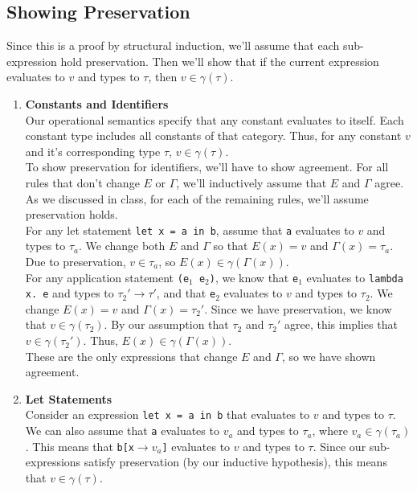 \documentclass[12pt]{article}
\newcommand{\G}{\Gamma}
\begin{document}
\subsection{Showing Preservation}
Since this is a proof by structural induction, we'll assume that each sub-expression hold preservation. Then we'll show that if the current expression evaluates to $v$ and types to $\tau$, then $v\in\gamma(\tau)$.

\begin{enumerate}
\item \textbf{Constants and Identifiers}\\
Our operational semantics specify that any constant evaluates to itself. Each constant type includes all constants of that category. Thus, for any constant $v$ and it's corresponding type $\tau$, $v\in\gamma(\tau)$.\\
To show preservation for identifiers, we'll have to show agreement. For all rules that don't change $E$ or $\G$, we'll inductively assume that $E$ and $\G$ agree. As we discussed in class, for each of the remaining rules, we'll assume preservation holds.\\
For any let statement \texttt{let x = a in b}, assume that \texttt{a} evaluates to $v$ and types to $\tau_a$. We change both $E$ and $\G$ so that $E(x) = v$ and $\G(x) = \tau_a$. Due to preservation, $v\in\tau_a$, so $E(x)\in\gamma(\G(x))$.\\
For any application statement \texttt{(e$_1$ e$_2$)}, we know that \texttt{e$_1$} evaluates to \texttt{lambda x.\ e} and types to $\tau_2'\rightarrow\tau'$, and that \texttt{e$_2$} evaluates to $v$ and types to $\tau_2$. We change $E(x) = v$ and $\G(x) = \tau_2'$. Since we have preservation, we know that $v\in\gamma(\tau_2)$. By our assumption that $\tau_2$ and $\tau_2'$ agree, this implies that $v\in\gamma(\tau_2')$. Thus, $E(x)\in\gamma(\G(x))$.\\
These are the only expressions that change $E$ and $\G$, so we have shown agreement.

\item \textbf{Let Statements}\\
Consider an expression \texttt{let x = a in b} that evaluates to $v$ and types to $\tau$. We can also assume that \texttt{a} evaluates to $v_a$ and types to $\tau_a$, where $v_a\in\gamma(\tau_a)$. This means that \texttt{b[x$\rightarrow v_a$]} evaluates to $v$ and types to $\tau$. Since our sub-expressions satisfy preservation (by our inductive hypothesis), this means that $v\in\gamma(\tau)$.


\end{enumerate}
\end{document}

